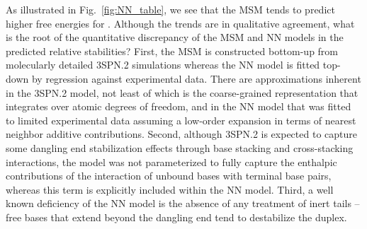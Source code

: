 \documentclass[journal=jpcbfk,manuscript=article]{achemso}
\newcommand*{\rood}[1]{{\color{red}{#1}}}
\begin{document}
As illustrated in Fig.~\ref{fig:NN_table}, we see that the MSM tends to predict higher free energies for \rood{all macrostates relative to the H state compared to the NN model}. Although the trends are in qualitative agreement, what is the root of the quantitative discrepancy of the MSM and NN models in the predicted relative stabilities? First, the MSM is constructed bottom-up from molecularly detailed 3SPN.2 simulations whereas the NN model is fitted top-down by regression against experimental data. There are approximations inherent in the 3SPN.2 model, not least of which is the coarse-grained representation that integrates over atomic degrees of freedom, and in the NN model that was fitted to limited experimental data assuming a low-order expansion in terms of nearest neighbor additive contributions. Second, although 3SPN.2 is expected to capture some dangling end stabilization effects through base stacking and cross-stacking interactions, the model was not parameterized to fully capture the enthalpic contributions of the interaction of unbound bases with terminal base pairs, whereas this term is explicitly included within the NN model. Third, a well known deficiency of the NN model is the absence of any treatment of inert tails -- free bases that extend beyond the dangling end tend to destabilize the duplex.\citep{DiMichele2014EffectHybridization}
\end{document}
